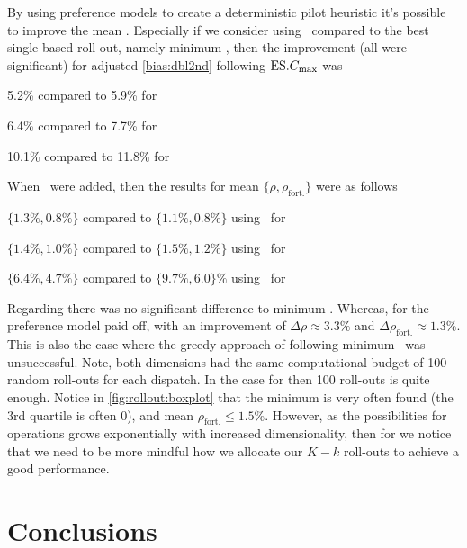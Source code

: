 By using preference models to create a deterministic pilot heuristic it's 
possible to improve the mean \namerho. Especially if we consider using 
\phiSDRRelated\ compared to the best single based roll-out, namely minimum 
\phiSPT, then the improvement (all were significant) for adjusted 
\ref{bias:dbl2nd} following $\text{ES}.{C_{\max}}$ was 
\begin{enumerate*}
    \item 5.2\% compared to 5.9\% for 
    \item 6.4\% compared to 7.7\% for  
    \item 10.1\% compared to 11.8\% for  
\end{enumerate*}
When \phiRNDRelated\ were added, then the results for mean 
$\{\rho,\rho_{\text{fort.}}\}$ were as follows
\begin{enumerate*}
    \item $\{1.3\%,0.8\%\}$ compared to $\{1.1\%,0.8\%\}$ using 
    \phiRNDmin\ for  
    \item $\{1.4\%,1.0\%\}$ compared to $\{1.5\%,1.2\%\}$ using 
    \phiRNDmin\ for  
    \item $\{6.4\%,4.7\%\}$ compared to $\{9.7\%,6.0\}\%$ using 
    \phiRNDmean\ for  
\end{enumerate*}
Regarding \Problem[6\times5]{} there was no significant difference to minimum
\phiRNDmin. 
Whereas, for  the preference model paid off, with an improvement 
of $\Delta\rho\approx3.3\%$ and $\Delta\rho_{\text{fort.}}\approx1.3\%$.
This is also the case where the greedy approach of following minimum 
\phiRNDmin\ was unsuccessful. Note, both dimensions had the same computational 
budget of 100 random roll-outs for each dispatch. 
In the case for \Problem[6\times5]{} then 100 roll-outs is quite enough. Notice 
in \cref{fig:rollout:boxplot} that the minimum is very often found (the 3rd 
quartile is often 0), and mean $\rho_{\text{fort.}}\leq1.5\%$.
However, as the possibilities for operations grows exponentially with increased 
dimensionality, then for  we notice that we need to be more 
mindful how we allocate our $K-k$ roll-outs to achieve a good performance.

\section{Conclusions}

